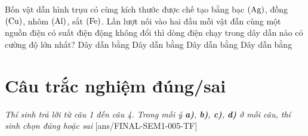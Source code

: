 \begin{ex}
	Bốn vật dẫn hình trụu có cùng kích thước được chế tạo bằng bạc $\left(\ce{Ag}\right)$, đồng $\left(\ce{Cu}\right)$, nhôm $\left(\ce{Al}\right)$, sắt $\left(\ce{Fe}\right)$. Lần lượt nối vào hai đầu mỗi vật đẫn cùng một nguồn điện có suất điện động không đổi thì dòng điện chạy trong dây dẫn nào có cường độ lớn nhất?
	\choice
	{Dây dẫn bằng }
	{Dây dẫn bằng }
	{Dây dẫn bằng }
	{Dây dẫn bằng }
\end{ex}
\section{Câu trắc nghiệm đúng/sai} 
\textit{Thí sinh trả lời từ câu 1 đến câu 4. Trong mỗi ý \textbf{a)}, \textbf{b)}, \textbf{c)}, \textbf{d)} ở mỗi câu, thí sinh chọn đúng hoặc sai}
\setcounter{ex}{0}
[ans/FINAL-SEM1-005-TF]
